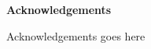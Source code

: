 
\clearemptydoublepage
{}
{}	

\vspace*{2cm}
{\Large \bf Acknowledgements}
\vspace{1cm}

Acknowledgements goes here
